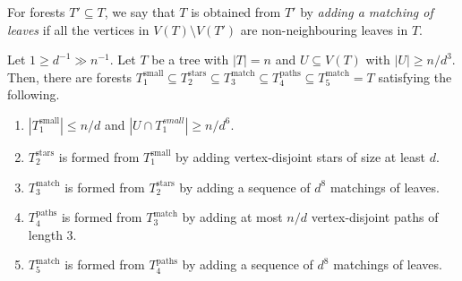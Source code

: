 For forests $T'\subseteq T$, we say that $T$ is obtained from $T'$ by \emph{adding a matching of leaves} if all the vertices in $V(T)\setminus V(T')$ are non-neighbouring leaves in $T$.
\begin{lemma}\label{Lemma_tree_splitting}
Let $1\geq  d^{-1} \gg n^{-1}$.
Let $T$ be a tree with $|T|=n$ and $U\subseteq V(T)$ with $|U|\geq n/d^3$.
Then, there are forests $T_1^{\mathrm{small}}\subseteq T_2^{\mathrm{stars}}\subseteq T_3^{\mathrm{match}}\subseteq T_4^{\mathrm{paths}}\subseteq T_5^{\mathrm{match}}=T$ satisfying the following.
\begin{enumerate}[label = {\bfseries \Alph{propcounter}\arabic{enumi}}]
\item $|T_{1}^{\mathrm{small}}|\leq  n/d$ and $|U\cap T_1^{small}|\geq n/d^6$.\label{rush1}
\item $T_2^{\mathrm{stars}}$ is formed from $T_{1}^{\mathrm{small}}$ by adding vertex-disjoint stars of size at least $d$.\label{rush2}
\item $T_3^{\mathrm{match}}$ is formed from $T_2^{\mathrm{stars}}$ by adding a sequence of $d^8$ matchings of leaves.\label{rush3}
\item $T_4^{\mathrm{paths}}$ is formed from $T_3^{\mathrm{match}}$ by adding at most $n/d$ vertex-disjoint paths of length $3$.\label{rush4}
\item $T_5^{\mathrm{match}}$ is formed from $T_4^{\mathrm{paths}}$ by adding a sequence of $d^8$ matchings of leaves.\label{rush5}
\end{enumerate}
\end{lemma}
